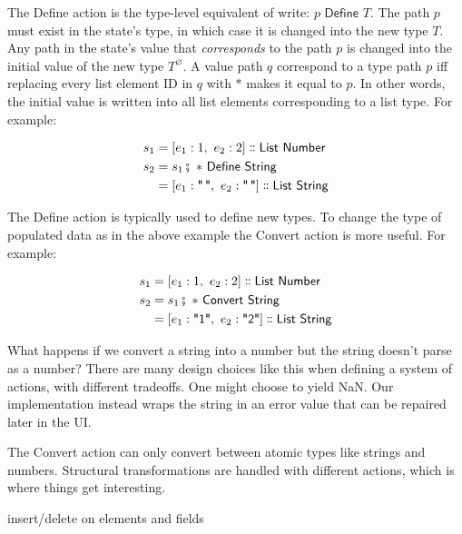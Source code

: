 \documentclass[english,submission]{programming}
\theoremstyle{definition}
\newcommand{\mathbox}[1]{\colorbox{black!10}{$#1$}}
\DeclareMathOperator{\exec}{\fatsemi\ }
\newcommand{\isa}{\dblcolon}
\newcommand{\quotedstring}[1]{\textsf{\textquotedbl{#1}\textquotedbl}}
\newcommand{\emptystring}{\textsf{\textquotedbl\ \!\textquotedbl}}
\begin{document}
The \textsf{Define} action is the type-level equivalent of \textsf{write}: \mathbox{p \textsf{ Define } T}. The path $p$ must exist in the state's type, in which case it is changed into the new type $T$. Any path in the state's value that \textit{corresponds} to the path $p$ is changed into the initial value of the new type $T^\varnothing$. A value path $q$ correspond to a type path $p$ iff replacing every list element ID in $q$ with $*$ makes it equal to $p$. In other words, the initial value is written into all list elements corresponding to a list type. For example:


\begin{align*}
s_1 &= [ e_1: 1,\  e_2: 2] \isa \textsf{List Number}\\
s_2 &= s_1 \exec * \textsf{ Define } \textsf{String}\\
    &= [ e_1: \emptystring,\  e_2: \emptystring] \isa \textsf{List String}\\
\end{align*}

The \textsf{Define} action is typically used to define new types. To change the type of populated data as in the above example the \textsf{Convert} action is more useful. For example:

\begin{align*}
s_1 &= [ e_1: 1,\  e_2: 2] \isa \textsf{List Number}\\
s_2 &= s_1 \exec * \textsf{ Convert } \textsf{String}\\
    &= [ e_1: \quotedstring{1},\  e_2: \quotedstring{2}] \isa \textsf{List String}\\
\end{align*}

What happens if we convert a string into a number but the string doesn't parse as a number? There are many design choices like this when defining a system of actions, with different tradeoffs. One might choose to yield \textsf{NaN}. Our implementation instead wraps the string in an error value that can be repaired later in the UI.

The \textsf{Convert} action can only convert between atomic types like strings and numbers. Structural transformations are handled with different actions, which is where things get interesting.

insert/delete on elements and fields
\end{document}
